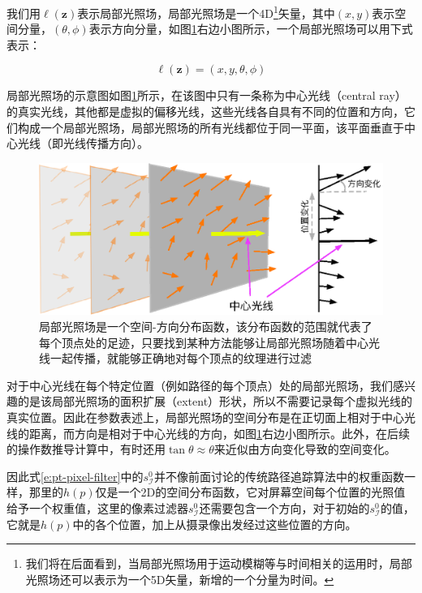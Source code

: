 我们用$\ell(\mathbf{z})$表示局部光照场，局部光照场是一个4D\footnote{我们将在后面看到，当局部光照场用于运动模糊等与时间相关的运用时，局部光照场还可以表示为一个5D矢量，新增的一个分量为时间。}矢量，其中$(x,y )$表示空间分量，$(\theta,\phi)$表示方向分量，如图\ref{f:pt-local-light-field}右边小图所示，一个局部光照场可以用下式表示：

\begin{equation}
	\ell(\mathbf{z})=(x,y,\theta,\phi)
\end{equation}

\noindent 局部光照场的示意图如图\ref{f:pt-local-light-field}所示，在该图中只有一条称为中心光线（central ray）的真实光线，其他都是虚拟的偏移光线，这些光线各自具有不同的位置和方向，它们构成一个局部光照场，局部光照场的所有光线都位于同一平面，该平面垂直于中心光线（即光线传播方向）。

\begin{figure}
	\includegraphics[width=\textwidth]{figures/pt/local-light-field}
	\caption{局部光照场是一个空间-方向分布函数，该分布函数的范围就代表了每个顶点处的足迹，只要找到某种方法能够让局部光照场随着中心光线一起传播，就能够正确地对每个顶点的纹理进行过滤}
	\label{f:pt-local-light-field}
\end{figure}

对于中心光线在每个特定位置（例如路径的每个顶点）处的局部光照场，我们感兴趣的是该局部光照场的面积扩展（extent）形状，所以不需要记录每个虚拟光线的真实位置。因此在参数表述上，局部光照场的空间分布是在正切面上相对于中心光线的距离，而方向是相对于中心光线的方向，如图\ref{f:pt-local-light-field}右边小图所示。此外，在后续的操作数推导计算中，有时还用$\tan \theta\approx\theta$来近似由方向变化导致的空间变化。

因此式\ref{e:pt-pixel-filter}中的$s^{0}_{\mathcal{I}}$并不像前面讨论的传统路径追踪算法中的权重函数一样，那里的$h(p)$仅是一个2D的空间分布函数，它对屏幕空间每个位置的光照值给予一个权重值，这里的像素过滤器$s^{0}_{\mathcal{I}}$还需要包含一个方向，对于初始的$s^{0}_{\mathcal{I}}$的值，它就是$h(p)$中的各个位置，加上从摄录像出发经过这些位置的方向。

